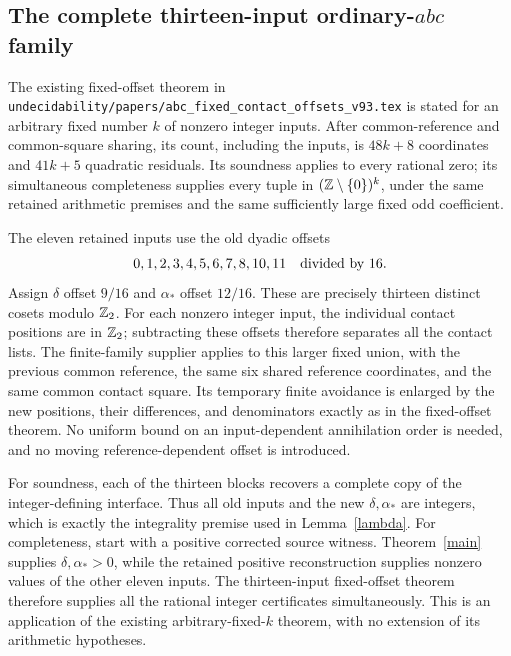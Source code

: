 \subsection*{The complete thirteen-input ordinary-\(abc\) family}

The existing fixed-offset theorem in
\nolinkurl{undecidability/papers/abc_fixed_contact_offsets_v93.tex}
is stated for an arbitrary fixed number \(k\) of nonzero integer
inputs. After common-reference and common-square sharing, its count,
including the inputs, is \(48k+8\) coordinates and \(41k+5\)
quadratic residuals. Its soundness applies to every rational zero;
its simultaneous completeness supplies every tuple in
\((\mathbb Z\setminus\{0\})^k\), under the same retained arithmetic
premises and the same sufficiently large fixed odd coefficient.

The eleven retained inputs use the old dyadic offsets
\[
       0,1,2,3,4,5,6,7,8,10,11\quad\hbox{divided by }16.
\]
Assign \(\delta\) offset \(9/16\) and \(\alpha_*\) offset
\(12/16\). These are precisely thirteen distinct cosets modulo
\(\mathbb Z_2\). For each nonzero integer input, the individual contact
positions are in \(\mathbb Z_2\); subtracting these offsets therefore
separates all the contact lists. The finite-family supplier applies
to this larger fixed union, with the previous common reference,
the same six shared reference coordinates, and the same common
contact square. Its temporary finite avoidance is enlarged by the
new positions, their differences, and denominators exactly as in
the fixed-offset theorem. No uniform bound on an input-dependent
annihilation order is needed, and no moving reference-dependent
offset is introduced.

For soundness, each of the thirteen blocks recovers a complete copy
of the integer-defining interface. Thus all old inputs and the new
\(\delta,\alpha_*\) are integers, which is exactly the integrality
premise used in Lemma~\ref{lambda}. For completeness, start with a
positive corrected source witness. Theorem~\ref{main} supplies
\(\delta,\alpha_*>0\), while the retained positive reconstruction
supplies nonzero values of the other eleven inputs. The
thirteen-input fixed-offset theorem therefore supplies all the
rational integer certificates simultaneously. This is an application
of the existing arbitrary-fixed-\(k\) theorem, with no extension of
its arithmetic hypotheses.

